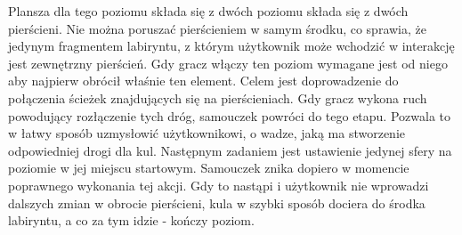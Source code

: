 \documentclass[a4paper,12pt,numbers=noenddot]{report}
\begin{document}
Plansza dla tego poziomu składa się z dwóch poziomu składa się z dwóch pierścieni. Nie można poruszać pierścieniem w samym środku, co sprawia, że jedynym fragmentem labiryntu, z którym użytkownik może wchodzić w interakcję jest zewnętrzny pierścień.
Gdy gracz włączy ten poziom wymagane jest od niego aby najpierw obrócił właśnie ten element. Celem jest doprowadzenie do połączenia ścieżek znajdujących się na pierścieniach. Gdy gracz wykona ruch powodujący rozłączenie tych dróg, samouczek powróci do tego etapu. Pozwala to w łatwy sposób uzmysłowić użytkownikowi, o wadze, jaką ma stworzenie odpowiedniej drogi dla kul. 
Następnym zadaniem jest ustawienie jedynej sfery na poziomie w jej miejscu startowym. Samouczek znika dopiero w momencie poprawnego wykonania tej akcji. Gdy to nastąpi i użytkownik nie wprowadzi dalszych zmian w obrocie pierścieni, kula w szybki sposób dociera do środka labiryntu, a co za tym idzie - kończy poziom.
\end{document}
